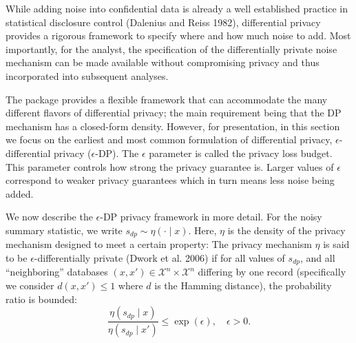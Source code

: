 While adding noise into confidential data is already a well established practice in statistical disclosure control (Dalenius and Reiss 1982), differential privacy
provides a rigorous framework to specify where and how much
noise to add.
Most importantly, for the analyst, the specification of the differentially private noise mechanism can
be made available without compromising privacy and thus incorporated into subsequent analyses.

The  package provides a flexible framework that can accommodate
the many different flavors of differential privacy; the main requirement being that
the DP mechanism has a closed-form density. However, for presentation,
in this section we focus on the earliest and most common
formulation of differential privacy, \(\epsilon\)-differential privacy (\(\epsilon\)-DP). The
\(\epsilon\) parameter is called the privacy loss budget. This parameter controls how
strong the privacy guarantee is. Larger values of \(\epsilon\) correspond to weaker
privacy guarantees which in turn means less noise being added.

We now describe the \(\epsilon\)-DP privacy framework in more detail. For the noisy summary
statistic, we write \(s_{dp} \sim \eta(\cdot \mid x)\). Here,
\(\eta\) is the density of the privacy mechanism designed to meet a certain property: The privacy mechanism
\(\eta\) is said to be \(\epsilon\)-differentially private (Dwork et al. 2006) if for all values of
\(s_{dp}\), and all ``neighboring'' databases \((x,x') \in \mathcal{X}^n \times \mathcal{X}^n\) differing
by one record (specifically we consider \(d(x,x') \leq 1\) where \(d\) is the Hamming distance), the probability ratio is bounded:
\[
\dfrac{\eta(s_{dp} \mid x)}{\eta(s_{dp} \mid x')} \leq \exp(\epsilon), \quad \epsilon > 0.
\]

